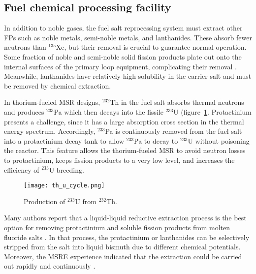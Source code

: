 \subsection{Fuel chemical processing facility} \label{sec:chemical_processing}
In addition to noble gases, the fuel salt reprocessing system must extract 
other \glspl{FP} such as noble metals, semi-noble metals, and lanthanides. These
absorb fewer neutrons than 
$^{135}$Xe, but their removal is crucial to guarantee normal operation. Some 
fraction of noble and semi-noble solid fission products plate out onto the 
internal surfaces of the primary loop equipment, complicating their removal 
\cite{briggs_molten-salt_1964}. Meanwhile, lanthanides have relatively high 
solubility in the carrier salt and must be removed by chemical extraction. 

In thorium-fueled \gls{MSR} designs, $^{232}$Th in the fuel salt absorbs 
thermal neutrons and produces $^{233}$Pa which then decays into the fissile 
$^{233}$U (figure~\ref{fig:th_u_reaction}. Protactinium presents a challenge, 
since it has a large absorption cross section in the thermal energy spectrum. 
Accordingly, $^{233}$Pa is continuously removed from the fuel salt into a 
protactinium decay tank to allow $^{233}$Pa to decay to $^{233}$U without 
poisoning the reactor. This feature allows the thorium-fueled \gls{MSR} to 
avoid neutron losses to protactinium, keeps fission products to a very low 
level, and increases the efficiency of $^{233}$U breeding. 

\begin{figure}[htp!] %
	\centering
	\texttt{[image: th\_u\_cycle.png]}
	\caption{Production of $^{233}$U from $^{232}$Th.}
	\label{fig:th_u_reaction}
\end{figure}

Many authors report that a liquid-liquid reductive extraction process is the 
best option for removing protactinium and soluble fission products from 
molten fluoride salts \cite{briggs_molten-salt_1969, delpech_molten_2010, 
doligez_coupled_2014}. In that process, the protactinium or lanthanides can be 
selectively stripped from the salt into liquid bismuth due to different 
chemical potentials. Moreover, the \gls{MSRE} experience indicated that the 
extraction could be carried out rapidly and continuously  
\cite{whatley_engineering_1970}.

